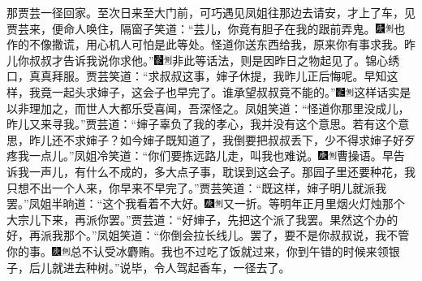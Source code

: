 那贾芸一径回家。至次日来至大门前，可巧遇见凤姐往那边去请安，才上了车，见贾芸来，便命人唤住，隔窗子笑道：``芸儿，你竟有胆子在我的跟前弄鬼。{\includegraphics[width=3mm]{../Images/00004}\includegraphics[width=3mm]{../Images/00011}\footnotesize \kaishu 也作的不像撒谎，用心机人可怕是此等处。}怪道你送东西给我，原来你有事求我。昨儿你叔叔才告诉我说你求他。''{\includegraphics[width=3mm]{../Images/00006}\includegraphics[width=3mm]{../Images/00011}\footnotesize \kaishu 非此等话法，则是因昨日之物起见了。锦心绣口，真真拜服。}贾芸笑道：``求叔叔这事，婶子休提，我昨儿正后悔呢。早知这样，我竟一起头求婶子，这会子也早完了。谁承望叔叔竟不能的。''{\includegraphics[width=3mm]{../Images/00006}\includegraphics[width=3mm]{../Images/00011}\footnotesize \kaishu 这样话实是以非理加之，而世人大都乐受喜闻，吾深怪之。}凤姐笑道：``怪道你那里没成儿，昨儿又来寻我。''贾芸道：``婶子辜负了我的孝心，我并没有这个意思。若有这个意思，昨儿还不求婶子？如今婶子既知道了，我倒要把叔叔丢下，少不得求婶子好歹疼我一点儿。''凤姐冷笑道：``你们要拣远路儿走，叫我也难说。{\includegraphics[width=3mm]{../Images/00004}\includegraphics[width=3mm]{../Images/00011}\footnotesize \kaishu 曹操语。}早告诉我一声儿，有什么不成的，多大点子事，耽误到这会子。那园子里还要种花，我只想不出一个人来，你早来不早完了。''贾芸笑道：``既这样，婶子明儿就派我罢。''凤姐半晌道：``这个我看着不大好。{\includegraphics[width=3mm]{../Images/00004}\includegraphics[width=3mm]{../Images/00011}\footnotesize \kaishu 又一折。}等明年正月里烟火灯烛那个大宗儿下来，再派你罢。''贾芸道：``好婶子，先把这个派了我罢。果然这个办的好，再派我那个。''凤姐笑道：``你倒会拉长线儿。罢了，要不是你叔叔说，我不管你的事。{\includegraphics[width=3mm]{../Images/00004}\includegraphics[width=3mm]{../Images/00011}\footnotesize \kaishu 总不认受冰麝贿。}我也不过吃了饭就过来，你到午错的时候来领银子，后儿就进去种树。''说毕，令人驾起香车，一径去了。

